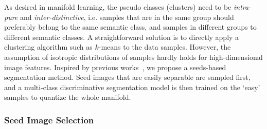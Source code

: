 \documentclass{bmvc2k}
\begin{document}
As desired in manifold learning, the pseudo classes (clusters) need to be \emph{intra-pure} 
and \emph{inter-distinctive}, i.e. samples that are in the same group should
preferably belong to the same semantic class, and samples in different groups 
to different semantic classes. A straightforward solution is to directly apply a clustering algorithm such as $k$-means to the data samples. However, the assumption of isotropic distributions of samples hardly holds for high-dimensional image features. Inspired by previous works~\cite{dai:ensemble:eccv12,dai:EnPro:iccv13}, we propose a seeds-based segmentation method. Seed images that are easily separable are sampled first, and a multi-class discriminative segmentation model is then trained on the `easy' samples to quantize the whole manifold.






%

\subsubsection{Seed Image Selection}
\label{sec:seeds}
\end{document}
